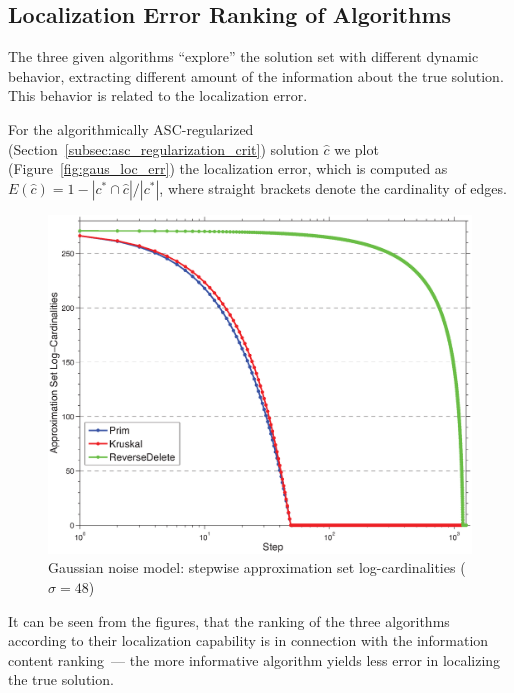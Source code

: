 \subsection{Localization Error Ranking of Algorithms}

The three given algorithms ``explore'' the solution set with different
dynamic behavior, extracting different amount of the information
about the true solution. This behavior is related to the localization error.

For the algorithmically ASC-regularized
(Section~\ref{subsec:asc_regularization_crit}) solution $\hat c$
we plot (Figure~\ref{fig:gaus_loc_err}) the localization error, which is
computed as $E(\hat c) = 1 - |c^* \cap \hat c| / |c^*|$, where straight brackets
denote the cardinality of edges.

\begin{figure}[!t]
\centering
\includegraphics[width=.9\textwidth]{figures/ch_mst/gaus_as_card}
\caption{Gaussian noise model: stepwise approximation set log-cardinalities ($\sigma = 48$)}
\label{fig:gaus_as_card}
\end{figure}

It can be seen from the figures, that the ranking of the three
algorithms according to their localization capability is in connection
with the information content ranking~--- the more informative
algorithm yields less error in localizing the true solution.

